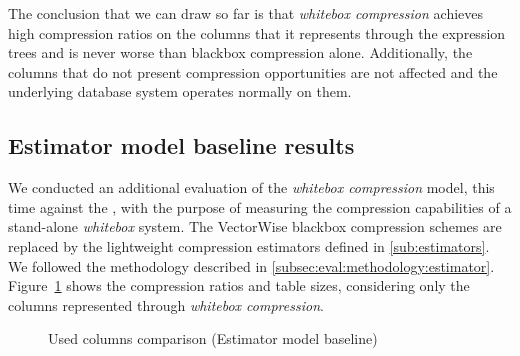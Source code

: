The conclusion that we can draw so far is that \textit{whitebox compression} achieves high compression ratios on the columns that it represents through the expression trees and is never worse than blackbox compression alone. Additionally, the columns that do not present compression opportunities are not affected and the underlying database system operates normally on them.



\subsection{Estimator model baseline results}
\label{subsec:eval:results:estimator}

We conducted an additional evaluation of the \textit{whitebox compression} model, this time against the , with the purpose of measuring the compression capabilities of a stand-alone \textit{whitebox} system. The VectorWise blackbox compression schemes are replaced by the lightweight compression estimators defined in \ref{sub:estimators}. We followed the methodology described in \ref{subsec:eval:methodology:estimator}. Figure~\ref{fig:eval:results:estimator:used} shows the compression ratios and table sizes, considering only the columns represented through \textit{whitebox compression}.

\begin{figure}[h]
  \centering
  \caption{Used columns comparison (Estimator model baseline)}
  \label{fig:eval:results:estimator:used}
\end{figure}

